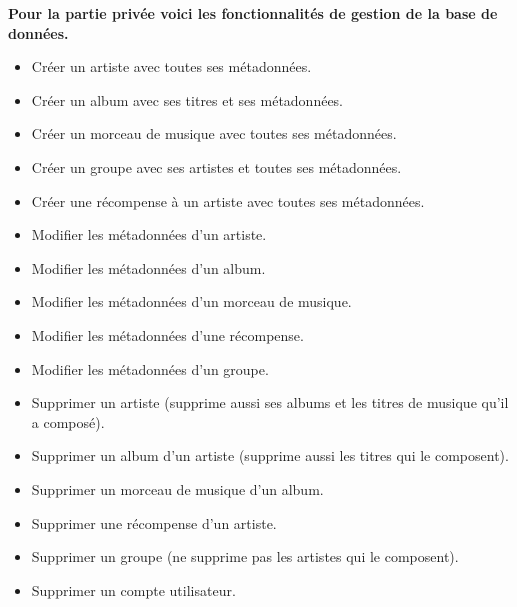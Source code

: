         \begin{paragraphe}
            \textbf{Pour la partie privée voici les fonctionnalités de gestion de la base de
            données.}
            \vspace{1em}
            \begin{itemize}
                \item Créer un artiste avec toutes ses métadonnées.
                \item Créer un album avec ses titres et ses métadonnées.
                \item Créer un morceau de musique avec toutes ses métadonnées.
                \item Créer un groupe avec ses artistes et toutes ses métadonnées.
                \item Créer une récompense à un artiste avec toutes ses métadonnées.
            \end{itemize}
            \vspace{1em}
            \begin{itemize}
                \item Modifier les métadonnées d'un artiste.
                \item Modifier les métadonnées d'un album.
                \item Modifier les métadonnées d'un morceau de musique.
                \item Modifier les métadonnées d'une récompense.
                \item Modifier les métadonnées d'un groupe.
            \end{itemize}
            \vspace{1em}
            \begin{itemize}
                \item Supprimer un artiste (supprime aussi ses albums et les titres de
                musique qu'il a composé).
                \item Supprimer un album d'un artiste (supprime aussi les titres qui le composent).
                \item Supprimer un morceau de musique d'un album.
                \item Supprimer une récompense d'un artiste.
                \item Supprimer un groupe (ne supprime pas les artistes qui le composent).
                \item Supprimer un compte utilisateur.
            \end{itemize}

\end{paragraphe}
